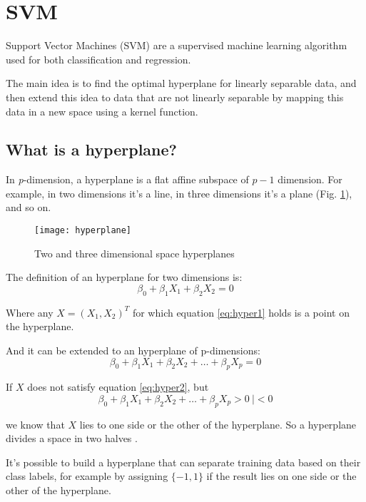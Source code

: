 \pagebreak

\section{SVM} \label{svm}
Support Vector Machines (SVM) are a supervised machine learning algorithm used for both classification and regression.

The main idea is to find the optimal hyperplane for linearly separable data, and then extend this idea to data that are not linearly separable by mapping this data in a new space using a kernel function.

\subsection{What is a hyperplane?}
In \textit{p}-dimension, a hyperplane is a flat affine subspace of $p - 1$ dimension. For example, in two dimensions it's a line, in three dimensions it's a plane (Fig. \ref{fig:hyperplane}), and so on.

\begin{figure}[H]
	\centering
	\texttt{[image: hyperplane]}
	\caption{Two and three dimensional space hyperplanes \cite{hyperplaneimg}}
	\label{fig:hyperplane}
\end{figure}

The definition of an hyperplane for two dimensions is:
\begin{equation} \label{eq:hyper1}
	\beta_0 + \beta_1 X_1 + \beta_2 X_2 = 0
\end{equation}

Where any $X = (X_1, X_2)^T$ for which equation \ref{eq:hyper1} holds is a point on the hyperplane.

And it can be extended to an hyperplane of p-dimensions:
\begin{equation} \label{eq:hyper2}
	\beta_0 + \beta_1 X_1 + \beta_2 X_2 + \dots + \beta_p X_p = 0
\end{equation}

If $X$ does not satisfy equation \ref{eq:hyper2}, but
\begin{equation} \label{eq:hyper3}
	\beta_0 + \beta_1 X_1 + \beta_2 X_2 + \dots + \beta_p X_p > 0 \ | < 0
\end{equation}

we know that $X$ lies to one side or the other of the hyperplane. So a hyperplane divides a space in two halves \cite{ISLR}.

It's possible to build a hyperplane that can separate training data based on their class labels, for example by assigning $\{-1, 1\}$ if the result lies on one side or the other of the hyperplane.

